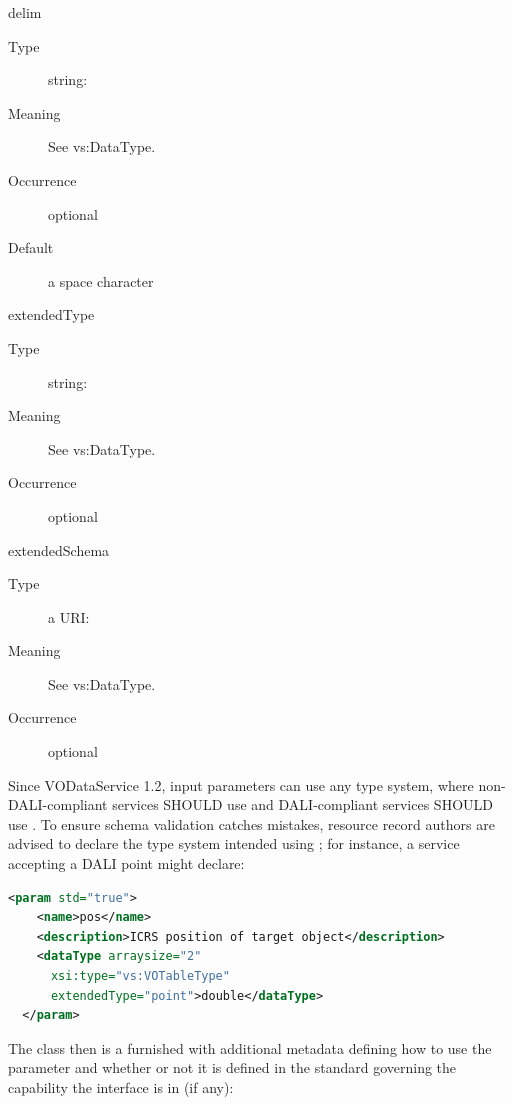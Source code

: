 \documentclass[11pt,a4paper]{ivoa}
\begin{document}
\begin{generated}
\begin{bigdescription}
\begin{description}
\end{description}
\item[delim]
\begin{description}
\item[Type] string: 
\item[Meaning] See vs:DataType.
\item[Occurrence] optional
\item[Default] a space character
\end{description}
\item[extendedType]
\begin{description}
\item[Type] string: 
\item[Meaning] See vs:DataType.
\item[Occurrence] optional
\end{description}
\item[extendedSchema]
\begin{description}
\item[Type] a URI: 
\item[Meaning] See vs:DataType.
\item[Occurrence] optional
\end{description}


\end{bigdescription}\endgroup

\endgroup
\end{generated}


Since VODataService 1.2, input parameters can use any type system,
where non-DALI-compliant services SHOULD use 
and DALI-compliant services SHOULD use .  To
ensure schema validation catches mistakes, resource record authors are
advised to declare the type system intended using ; for
instance, a service accepting a DALI point might declare:

\begin{lstlisting}[language=XML]
  <param std="true">
    <name>pos</name>
    <description>ICRS position of target object</description>
    <dataType arraysize="2" 
      xsi:type="vs:VOTableType" 
      extendedType="point">double</dataType>
  </param>
\end{lstlisting}

The  class then is a 
furnished with additional metadata
defining how to use the parameter and whether or not it is defined in
the standard governing the capability the interface is in (if any):
\end{document}
